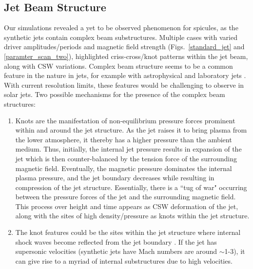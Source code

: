 \subsection{Jet Beam Structure}
\label{subsec:j_beam_struc}
Our simulations revealed a yet to be observed phenomenon for spicules, as the synthetic jets contain complex beam substructures. Multiple cases with varied driver amplitudes/periods and magnetic field strength (Figs.~\ref{standard_jet} and \ref{paramter_scan_two}), highlighted criss-cross/knot patterns within the jet beam, along with CSW variations. Complex beam structure seems to be a common feature in the nature in jets, for example with astrophysical \citep{van_Putten_1996ApJ467L57V, DeGouveiaDalPino2005, Hada2013ApJ77570H, Cohen2014ApJ787151C, Hervet2017AnA606A103H} and laboratory jets \citep{Menon2010, Edgington-Mitchell2014, Ono2014}. With current resolution limits, these features would be challenging to observe in solar jets. Two possible mechanisms for the presence of the complex beam structures:
\begin{enumerate}
\item{Knots are the manifestation of non-equilibrium pressure forces prominent within and around the jet structure. As the jet raises it to bring plasma from the lower atmosphere, it thereby has a higher pressure than the ambient medium. Thus, initially, the internal jet pressure results in expansion of the jet which is then counter-balanced by the tension force of the surrounding magnetic field. Eventually, the magnetic pressure dominates the internal plasma pressure, and the jet boundary decreases while resulting in compression of the jet structure. Essentially, there is a ``tug of war" occurring between the pressure forces of the jet and the surrounding magnetic field. This process over height and time appears as CSW deformation of the jet, along with the sites of high density/pressure as knots within the jet structure.}
\item{The knot features could be the sites within the jet structure where internal shock waves become reflected from the jet boundary \citep{Norman1982}. If the jet has supersonic velocities  (synthetic jets have Mach numbers are around $\sim$1-3), it can give rise to a myriad of internal substructures due to high velocities.}
\end{enumerate}
